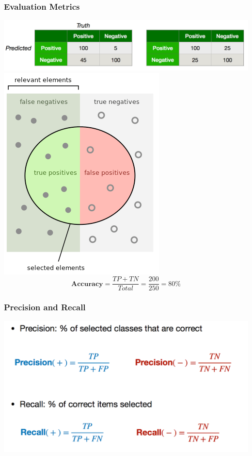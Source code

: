 \begin{frame}
\frametitle{Evaluation Metrics}
\includegraphics[scale=0.25]{figures/classifiers/evalex2.png}
\\
\centering
\includegraphics[scale=0.25]{figures/classifiers/evalterms.png}
\begin{equation*}
\textbf{Accuracy} = \frac{TP + TN}{Total} = \frac{200}{250} = 80\%
\end{equation*}
\end{frame}

\begin{frame}
\frametitle{Precision and Recall}
\centering
\includegraphics[scale=0.25]{figures/classifiers/prdef.png}
\end{frame}

